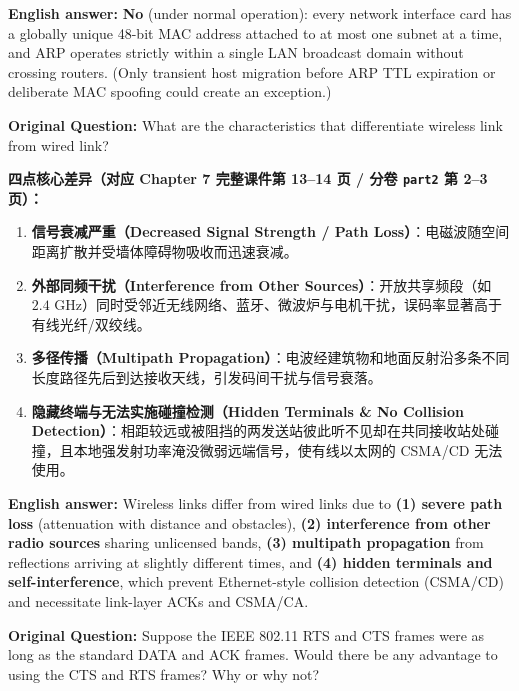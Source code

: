 \textbf{English answer:} \textbf{No} (under normal operation): every network interface card has a globally unique 48-bit MAC address attached to at most one subnet at a time, and ARP operates strictly within a single LAN broadcast domain without crossing routers. (Only transient host migration before ARP TTL expiration or deliberate MAC spoofing could create an exception.)



\textbf{Original Question:} What are the characteristics that differentiate wireless link from wired link?

\textbf{四点核心差异（对应 Chapter 7 完整课件第 13–14 页 / 分卷 \texttt{part2} 第 2–3 页）：}
\begin{enumerate}
\item \textbf{信号衰减严重（Decreased Signal Strength / Path Loss）}：电磁波随空间距离扩散并受墙体障碍物吸收而迅速衰减。
\item \textbf{外部同频干扰（Interference from Other Sources）}：开放共享频段（如 $2.4\text{ GHz}$）同时受邻近无线网络、蓝牙、微波炉与电机干扰，误码率显著高于有线光纤/双绞线。
\item \textbf{多径传播（Multipath Propagation）}：电波经建筑物和地面反射沿多条不同长度路径先后到达接收天线，引发码间干扰与信号衰落。
\item \textbf{隐藏终端与无法实施碰撞检测（Hidden Terminals \& No Collision Detection）}：相距较远或被阻挡的两发送站彼此听不见却在共同接收站处碰撞，且本地强发射功率淹没微弱远端信号，使有线以太网的 CSMA/CD 无法使用。
\end{enumerate}

\textbf{English answer:} Wireless links differ from wired links due to \textbf{(1) severe path loss} (attenuation with distance and obstacles), \textbf{(2) interference from other radio sources} sharing unlicensed bands, \textbf{(3) multipath propagation} from reflections arriving at slightly different times, and \textbf{(4) hidden terminals and self-interference}, which prevent Ethernet-style collision detection (CSMA/CD) and necessitate link-layer ACKs and CSMA/CA.



\textbf{Original Question:} Suppose the IEEE 802.11 RTS and CTS frames were as long as the standard DATA and ACK frames. Would there be any advantage to using the CTS and RTS frames? Why or why not?

